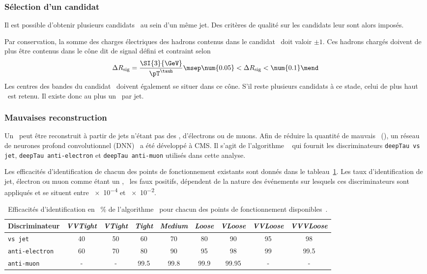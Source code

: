 \subsubsection{Sélection d'un candidat}
Il est possible d'obtenir plusieurs candidats \tauh\ au sein d'un même jet.
Des critères de qualité sur les candidats leur sont alors imposés.
\par
Par conservation, la somme des charges électriques des hadrons contenus dans le candidat \tauh\ doit valoir $\pm1$.
Ces hadrons chargés doivent de plus être contenus dans le cône dit \og de signal \fg{} défini et contraint selon
\begin{equation}
\Delta R_\text{sig} = \frac{\SI{3}{\GeV}}{\pT^{\tauh}}
\msep
\num{0.05} < \Delta R_\text{sig} < \num{0.1}
\mend
\end{equation}
Les centres des bandes du candidat \tauh\ doivent également se situer dans ce cône.
S'il reste plusieurs candidats à ce stade, celui de plus haut \pT\ est retenu.
Il existe donc au plus un \tauh\ par jet.
\subsubsection{Mauvaises reconstruction}
Un \tauh\ peut être reconstruit à partir de jets n'étant pas des \tauh, d'électrons ou de muons.
Afin de réduire la quantité de mauvais \tauh\ (\ftauh), un réseau de neurones profond convolutionnel (DNN)~\cite{DNN} a été développé à CMS.
Il s'agit de l'algorithme \DEEPTAU~\cite{CMS-DP-2019-033} qui fournit les discriminateurs
\texttt{deepTau vs jet},
\texttt{deepTau anti-electron} et
\texttt{deepTau anti-muon}
utilisés dans cette analyse.
\par
Les efficacités d'identification de chacun des points de fonctionnement existants sont donnés dans le tableau~\ref{tab-JERC-section-taus-DEEPTAU_eff}.
Les taux d'identification de jet, électron ou muon comme étant un \tauh, \ie\ les faux positifs, dépendent de la nature des événements sur lesquels ces discriminateurs sont appliqués et se situent entre \num{e-4} et \num{e-2}.
\begin{table}[h]
\centering
\begin{tabular}{lcccccccc}
\toprule
Discriminateur & \emph{VVTight} & \emph{VTight} & \emph{Tight} & \emph{Medium} & \emph{Loose} & \emph{VLoose} & \emph{VVLoose} & \emph{VVVLoose}\\
\midrule
\texttt{vs jet} & \num{40} & \num{50} & \num{60} & \num{70} & \num{80} & \num{90} & \num{95} & \num{98} \\
\texttt{anti-electron} & \num{60} & \num{70} & \num{80} & \num{90} & \num{95} & \num{98} & \num{99} & \num{99.5} \\
\texttt{anti-muon} & - & - & \num{99.5} & \num{99.8} & \num{99.9} & \num{99.95} & - & - \\
\bottomrule
\end{tabular}
\caption[Efficacités d'identification de l'algorithme \DEEPTAU.]{Efficacités d'identification en \SI{}{\%} de l'algorithme \DEEPTAU\ pour chacun des points de fonctionnement disponibles~\cite{CMS-DP-2019-033,Androsov_deeptau}.}
\label{tab-JERC-section-taus-DEEPTAU_eff}
\end{table}